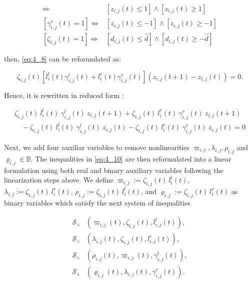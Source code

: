\begin{align*}
[\gamma^l _{i,j}(t) = 1] \Leftrightarrow & [z_{i,j}(t) \leq 1] \wedge [z_{i,j}(t) \geq 1]
\\
[\gamma^r_{i,j}(t) = 1] \Leftrightarrow & [z_{i,j}(t) \leq -1] \wedge [z_{i,j}(t) \geq -1]
\\
[\zeta_{i,j}(t) = 1] \Leftrightarrow & [d_{i,j}(t) \leq \hat{d}] \wedge [d_{i,j}(t) \geq -\hat{d}]
\end{align*}

then, \ref{eq:4_8} can be reformulated as:

\begin{equation}
 \zeta_{i,j}(t)[l^l_i(t)\gamma^l_{i,j}(t) + l^r_i(t)\gamma^r_{i,j}(t) ](z_{i,j}(t+1)-z_{i,j}(t)) = 0.   
\end{equation}

Hence, it is rewritten in reduced form :


\begin{multline}
\zeta_{i,j}(t) \ l^l_i(t)\ \gamma^l_{i,j}(t)\ z_{i,j}(t+1) + \zeta_{i,j}(t)\ l^r_i(t)\ \gamma^r_{i,j}(t)\ z_{i,j}(t+1) \\
\quad - \zeta_{i,j}(t)\ l^l_i(t)\ \gamma^l_{i,j}(t)\ z_{i,j}(t) - \zeta_{i,j}(t)\  l^r_i(t)\ \gamma^r_{i,j}(t)\ z_{i,j}(t) = 0
\label{eq:4_10}
\end{multline}


Next, we add four auxiliar variables to remove nonlinearities $\varpi_{i,j} , \lambda_{i,j}, \rho_{i,j}$ and $\varrho_{i,j} \in \mathbb{B}$. The inequalities in \ref{eq:4_10} are then reformulated into a linear formulation using both real and binary auxiliary variables following the linearization steps above. We define $\varpi_{i,j}:= \zeta_{i,j}(t) \ l^l_i(t)$, $\lambda_{i,j} := \zeta_{i,j}(t)\ l^r_i(t)$, $\rho_{i,j} := \zeta_{i,j}(t)\ l^l_i(t)$, and $\varrho_{i,j} := \zeta_{i,j}(t)\  l^r_i(t)$ as binary variables which satisfy the next system of inequalities

\begin{align}
\mathcal{S}_\wedge & (\varpi_{i,j}(t),\zeta_{i,j}(t), l^l_{i,j}(t)),
\\
\mathcal{S}_\wedge & (\lambda_{i,j}(t),\zeta_{i,j}(t), l^r_{i,j}(t)),
\\
\mathcal{S}_\wedge & (\rho_{i,j}(t),\varpi_{i,j}(t), \gamma^l_{i,j}(t)),
\\
\mathcal{S}_\wedge & (\varrho_{i,j}(t),\lambda_{i,j}(t), \gamma^r_{i,j}(t)).
\end{align}



